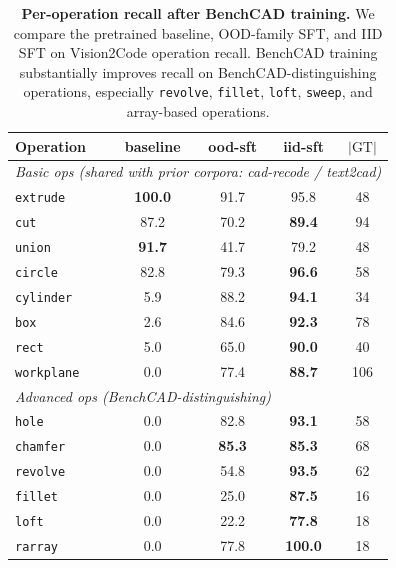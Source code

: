 \begin{table}[t]
  \centering
  \small
  \setlength{\tabcolsep}{5pt}
  \renewcommand{\arraystretch}{1.15}
  \caption{\textbf{Per-operation recall after BenchCAD training.}
  We compare the pretrained baseline, OOD-family SFT, and IID SFT on Vision2Code operation recall. BenchCAD training substantially improves recall on BenchCAD-distinguishing operations, especially \texttt{revolve}, \texttt{fillet}, \texttt{loft}, \texttt{sweep}, and array-based operations.}
  \label{tab:op_recall_train}
  \begin{tabular}{l c c c c}
  \toprule
  Operation & baseline & ood-sft & iid-sft & $|\text{GT}|$ \\
  \midrule
  \multicolumn{5}{l}{\emph{Basic ops (shared with prior corpora: cad-recode / text2cad)}} \\
  \texttt{extrude}   & \textbf{100.0} & 91.7           & 95.8           & 48  \\
  \texttt{cut}       & 87.2           & 70.2           & \textbf{89.4}  & 94  \\
  \texttt{union}     & \textbf{91.7}  & 41.7           & 79.2           & 48  \\
  \texttt{circle}    & 82.8           & 79.3           & \textbf{96.6}  & 58  \\
  \texttt{cylinder}  & 5.9            & 88.2           & \textbf{94.1}  & 34  \\
  \texttt{box}       & 2.6            & 84.6           & \textbf{92.3}  & 78  \\
  \texttt{rect}      & 5.0            & 65.0           & \textbf{90.0}  & 40  \\
  \texttt{workplane} & 0.0            & 77.4           & \textbf{88.7}  & 106 \\
  \midrule
  \multicolumn{5}{l}{\emph{Advanced ops (BenchCAD-distinguishing)}} \\
  \texttt{hole}         & 0.0            & 82.8           & \textbf{93.1}  & 58 \\
  \texttt{chamfer}      & 0.0            & \textbf{85.3}  & \textbf{85.3}  & 68 \\
  \texttt{revolve}      & 0.0            & 54.8           & \textbf{93.5}  & 62 \\
  \texttt{fillet}       & 0.0            & 25.0           & \textbf{87.5}  & 16 \\
  \texttt{loft}         & 0.0            & 22.2           & \textbf{77.8}  & 18 \\
  \texttt{rarray}       & 0.0            & 77.8           & \textbf{100.0} & 18 \\

\end{tabular}
\end{table}
